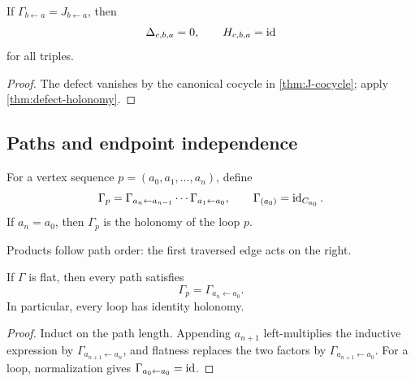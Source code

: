 \begin{corollary}
\label{cor:canonical-zero-defect}
If $\Gamma_{b\leftarrow a}=J_{b\leftarrow a}$, then
\[
\Delta_{c,b,a}=0,
\qquad
H_{c,b,a}=\operatorname{id}
\]
for all triples.
\end{corollary}

\begin{proof}
The defect vanishes by the canonical cocycle in
\cref{thm:J-cocycle}; apply \cref{thm:defect-holonomy}.
\end{proof}

\subsection{Paths and endpoint independence}

\begin{definition}
\label{def:path-transport}
For a vertex sequence
$p=(a_0,a_1,\ldots,a_n)$, define
\[
\Gamma_p
=
\Gamma_{a_n\leftarrow a_{n-1}}\cdots
\Gamma_{a_1\leftarrow a_0},
\qquad
\Gamma_{(a_0)}=\operatorname{id}_{C_{a_0}}.
\]
If $a_n=a_0$, then $\Gamma_p$ is the holonomy of the loop $p$.
\end{definition}

Products follow path order: the first traversed edge acts on the right.

\begin{proposition}
\label{prop:flat-endpoints}
If $\Gamma$ is flat, then every path satisfies
\[
\Gamma_p=\Gamma_{a_n\leftarrow a_0}.
\]
In particular, every loop has identity holonomy.
\end{proposition}

\begin{proof}
Induct on the path length.  Appending $a_{n+1}$ left-multiplies the
inductive expression by $\Gamma_{a_{n+1}\leftarrow a_n}$, and flatness
replaces the two factors by
$\Gamma_{a_{n+1}\leftarrow a_0}$.  For a loop, normalization gives
$\Gamma_{a_0\leftarrow a_0}=\operatorname{id}$.
\end{proof}

